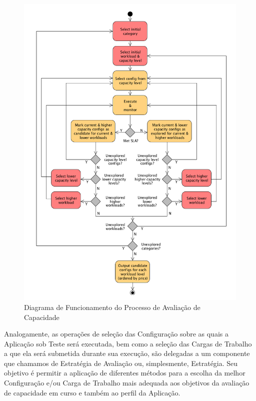 \begin{figure}[hbt]
  \caption{\label{fig_processo_aval_capacidade}Diagrama de Funcionamento do Processo de Avaliação de Capacidade}
  \begin{center}
    \includegraphics[scale=0.45]{img/diagrama-avaliacao-capacidade-v14}
  \end{center}
\end{figure}

Analogamente, as operações de seleção das Configuração sobre as quais a Aplicação
sob Teste será executada, bem como a seleção das Cargas de Trabalho a que ela 
será submetida durante sua execução, são delegadas a um componente que chamamos de
Estratégia de Avaliação ou, simplesmente, Estratégia. Seu objetivo é permitir a
aplicação de diferentes métodos para a escolha da melhor Configuração e/ou Carga 
de Trabalho mais adequada aos objetivos da avaliação de capacidade em curso e 
também ao perfil da Aplicação.

